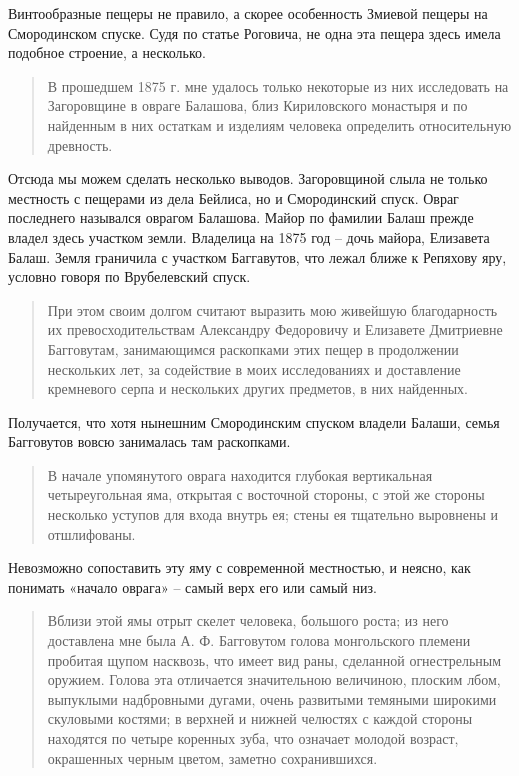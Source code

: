 Винтообразные пещеры не правило, а скорее особенность Змиевой пещеры на Смородинском спуске. Судя по статье Роговича, не одна эта пещера здесь имела подобное строение, а несколько.

\begin{quotation}
В прошедшем 1875 г. мне удалось только некоторые из них исследовать на Загоровщине в овраге Балашова, близ Кириловского монастыря и по найденным в них остаткам и изделиям человека определить относительную древность. 
\end{quotation}

Отсюда мы можем сделать несколько выводов. Загоровщиной слыла не только местность с пещерами из дела Бейлиса, но и Смородинский спуск. Овраг последнего назывался оврагом Балашова. Майор по фамилии Балаш прежде владел здесь участком земли. Владелица на 1875 год – дочь майора, Елизавета Балаш. Земля граничила с участком Баггавутов, что лежал ближе к Репяхову яру, условно говоря по Врубелевский спуск.

\begin{quotation}
При этом своим долгом считают выразить мою живейшую благодарность их превосходительствам Александру Федоровичу и Елизавете Дмитриевне Багговутам, занимающимся раскопками этих пещер в продолжении нескольких лет, за содействие в моих исследованиях и доставление кремневого серпа и нескольких других предметов, в них найденных.
\end{quotation}

Получается, что хотя нынешним Смородинским спуском владели Балаши, семья Багговутов вовсю занималась там раскопками.

\begin{quotation}
В начале упомянутого оврага находится глубокая вертикальная четыреугольная яма, открытая с восточной стороны, с этой же стороны несколько уступов для входа внутрь ея; стены ея тщательно выровнены и отшлифованы.
\end{quotation}

Невозможно сопоставить эту яму с современной местностью, и неясно, как понимать «начало оврага» – самый верх его или самый низ.

\begin{quotation}
Вблизи этой ямы отрыт скелет человека, большого роста; из него доставлена мне была А. Ф. Багговутом голова монгольского племени пробитая щупом насквозь, что имеет вид раны, сделанной огнестрельным оружием. Голова эта отличается значительною величиною, плоским лбом, выпуклыми надбровными дугами, очень развитыми темяными широкими скуловыми костями; в верхней и нижней челюстях с каждой стороны находятся по четыре коренных зуба, что означает молодой возраст, окрашенных черным цветом, заметно сохранившихся.
\end{quotation}

